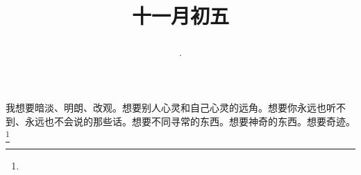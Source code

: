\title{\date[d=5,m=12,y=2024][year:cn-y,年,month:cn,day:cn,日,·,weekday]·十一月初五 }
我想要暗淡、明朗、改观。想要别人心灵和自己心灵的远角。想要你永远也听不到、永远也不会说的那些话。想要不同寻常的东西。想要神奇的东西。想要奇迹。\footnote{ }

